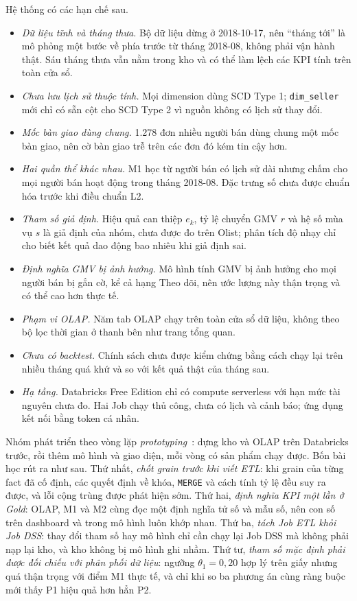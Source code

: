 \documentclass[a4paper]{article}
\begin{document}
Hệ thống có các hạn chế sau.
\begin{itemize}
  \item \textit{Dữ liệu tĩnh và tháng thưa.} Bộ dữ liệu dừng ở 2018-10-17, nên ``tháng tới'' là mô phỏng một bước về phía trước từ tháng 2018-08, không phải vận hành thật. Sáu tháng thưa vẫn nằm trong kho và có thể làm lệch các KPI tính trên toàn cửa sổ.
  \item \textit{Chưa lưu lịch sử thuộc tính.} Mọi dimension dùng SCD Type 1; \texttt{dim\_seller} mới chỉ có sẵn cột cho SCD Type 2 vì nguồn không có lịch sử thay đổi.
  \item \textit{Mốc bàn giao dùng chung.} 1.278 đơn nhiều người bán dùng chung một mốc bàn giao, nên cờ bàn giao trễ trên các đơn đó kém tin cậy hơn.
  \item \textit{Hai quần thể khác nhau.} M1 học từ người bán có lịch sử dài nhưng chấm cho mọi người bán hoạt động trong tháng 2018-08. Đặc trưng số chưa được chuẩn hóa trước khi điều chuẩn L2.
  \item \textit{Tham số giả định.} Hiệu quả can thiệp $e_k$, tỷ lệ chuyển GMV $r$ và hệ số mùa vụ $s$ là giả định của nhóm, chưa được đo trên Olist; phân tích độ nhạy chỉ cho biết kết quả dao động bao nhiêu khi giả định sai.
  \item \textit{Định nghĩa GMV bị ảnh hưởng.} Mô hình tính GMV bị ảnh hưởng cho mọi người bán bị gắn cờ, kể cả hạng Theo dõi, nên ước lượng này thận trọng và có thể cao hơn thực tế.
  \item \textit{Phạm vi OLAP.} Năm tab OLAP chạy trên toàn cửa sổ dữ liệu, không theo bộ lọc thời gian ở thanh bên như trang tổng quan.
  \item \textit{Chưa có backtest.} Chính sách chưa được kiểm chứng bằng cách chạy lại trên nhiều tháng quá khứ và so với kết quả thật của tháng sau.
  \item \textit{Hạ tầng.} Databricks Free Edition chỉ có compute serverless với hạn mức tài nguyên chưa đo. Hai Job chạy thủ công, chưa có lịch và cảnh báo; ứng dụng kết nối bằng token cá nhân.
\end{itemize}

Nhóm phát triển theo vòng lặp \textit{prototyping}~\cite{bib:turban_dss}: dựng kho và OLAP trên Databricks trước, rồi thêm mô hình và giao diện, mỗi vòng có sản phẩm chạy được. Bốn bài học rút ra như sau. Thứ nhất, \textit{chốt grain trước khi viết ETL}: khi grain của từng fact đã cố định, các quyết định về khóa, \texttt{MERGE} và cách tính tỷ lệ đều suy ra được, và lỗi cộng trùng được phát hiện sớm. Thứ hai, \textit{định nghĩa KPI một lần ở Gold}: OLAP, M1 và M2 cùng đọc một định nghĩa tử số và mẫu số, nên con số trên dashboard và trong mô hình luôn khớp nhau. Thứ ba, \textit{tách Job ETL khỏi Job DSS}: thay đổi tham số hay mô hình chỉ cần chạy lại Job DSS mà không phải nạp lại kho, và kho không bị mô hình ghi nhầm. Thứ tư, \textit{tham số mặc định phải được đối chiếu với phân phối dữ liệu}: ngưỡng $\theta_1 = 0{,}20$ hợp lý trên giấy nhưng quá thận trọng với điểm M1 thực tế, và chỉ khi so ba phương án cùng ràng buộc mới thấy P1 hiệu quả hơn hẳn P2.
\end{document}
